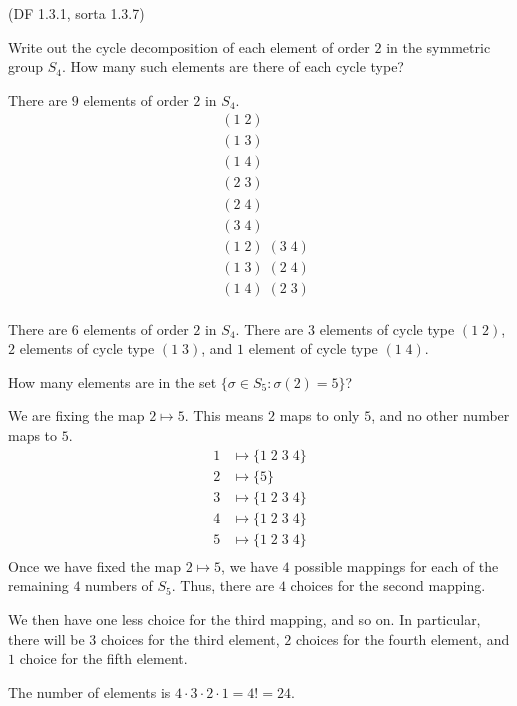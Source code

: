 \begin{problem}{\textsf{(DF 1.3.1, sorta 1.3.7)}}
\begin{enumalph}
\begin{Answer}
\begin{enumroman}
    \end{enumroman}
  \end{Answer}
  
  \newpage
  \item Write out the cycle decomposition of each element of order $2$ in the 
  symmetric group $S_4$.  How many such elements are there of each cycle type?
  \begin{Answer}
    \begin{enumroman}
      \item There are $9$ elements of order $2$ in $S_4$.
      \begin{align*}
        &(1\;2) \\
        &(1\;3) \\
        &(1\;4) \\
        &(2\;3) \\
        &(2\;4) \\
        &(3\;4) \\
        &(1\;2)\; (3\;4) \\
        &(1\;3)\; (2\;4) \\
        &(1\;4)\; (2\;3) \\
      \end{align*}
      \item There are $6$ elements of order $2$ in $S_4$.  There are $3$ elements
      of cycle type $(1\;2)$, $2$ elements of cycle type $(1\;3)$, and $1$ element
      of cycle type $(1\;4)$.
    \end{enumroman}
  \end{Answer}
  \item How many elements are in the set $\{\sigma \in S_5:\sigma(2)=5\}$?
  \begin{Answer}
    We are fixing the map $2 \mapsto 5$.
    This means $2$ maps to only $5$, and no other number maps to $5$.
    \begin{align*}
      1 &\mapsto \{1\;2\;3\;4\} \\
      2 &\mapsto \{5\} \\
      3 &\mapsto \{1\;2\;3\;4\} \\
      4 &\mapsto \{1\;2\;3\;4\} \\
      5 &\mapsto \{1\;2\;3\;4\} \\
    \end{align*}
    Once we have fixed the map $2 \mapsto 5$, we have
    $4$ possible mappings for each of the remaining $4$ numbers of $S_5$.
    Thus, there are $4$ choices for the second mapping.

    \noindent
    We then have one less choice for the third mapping, and so on.
    In particular, there will be $3$ choices for the third element,
    $2$ choices for the fourth element,
    and $1$ choice for the fifth element.
    
    \noindent
    The number of elements is $4 \cdot 3 \cdot 2 \cdot 1 = 4! = 24$.
  \end{Answer}
  \end{enumalph}
\end{problem}
